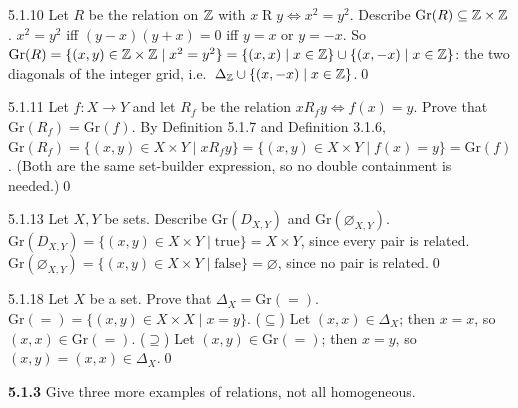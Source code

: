 \begin{bookex}[recommended]{5.1.10}
Let $R$ be the relation on $\mathbb{Z}$ with $x\mathrel Ry\Leftrightarrow x^2=y^2$. Describe $\mathrm{Gr}(R)\subseteq\mathbb{Z}\times\mathbb{Z}$.
\solution
$x^2=y^2$ iff $(y-x)(y+x)=0$ iff $y=x$ or $y=-x$. So $\mathrm{Gr}(R)=\{(x,y)\in\mathbb{Z}\times\mathbb{Z}\mid x^2=y^2\}=\{(x,x)\mid x\in\mathbb{Z}\}\cup\{(x,-x)\mid x\in\mathbb{Z}\}$: the two diagonals of the integer grid, i.e.\ $\Delta_{\mathbb{Z}}\cup\{(x,-x)\mid x\in\mathbb{Z}\}$.\qed
\end{bookex}

\begin{bookex}[recommended]{5.1.11}
Let $f:X\to Y$ and let $R_f$ be the relation $x\mathrel{R_f}y\Leftrightarrow f(x)=y$. Prove that $\mathrm{Gr}(R_f)=\mathrm{Gr}(f)$.
\solution
By Definition 5.1.7 and Definition 3.1.6, $\mathrm{Gr}(R_f)=\{(x,y)\in X\times Y\mid x\mathrel{R_f}y\}=\{(x,y)\in X\times Y\mid f(x)=y\}=\mathrm{Gr}(f)$. (Both are the same set-builder expression, so no double containment is needed.)\qed
\end{bookex}

\begin{bookex}[essential]{5.1.13}
Let $X,Y$ be sets. Describe $\mathrm{Gr}(D_{X,Y})$ and $\mathrm{Gr}(\varnothing_{X,Y})$.
\solution
$\mathrm{Gr}(D_{X,Y})=\{(x,y)\in X\times Y\mid\text{true}\}=X\times Y$, since every pair is related. $\mathrm{Gr}(\varnothing_{X,Y})=\{(x,y)\in X\times Y\mid\text{false}\}=\varnothing$, since no pair is related.\qed
\end{bookex}

\begin{bookex}[recommended]{5.1.18}
Let $X$ be a set. Prove that $\Delta_X=\mathrm{Gr}(=)$.
\solution
$\mathrm{Gr}(=)=\{(x,y)\in X\times X\mid x=y\}$. ($\subseteq$) Let $(x,x)\in\Delta_X$; then $x=x$, so $(x,x)\in\mathrm{Gr}(=)$. ($\supseteq$) Let $(x,y)\in\mathrm{Gr}(=)$; then $x=y$, so $(x,y)=(x,x)\in\Delta_X$.\qed
\end{bookex}

\begin{trybox}[{5.1.3 \fO}]
\textbf{5.1.3} Give three more examples of relations, not all homogeneous.
\end{trybox}

